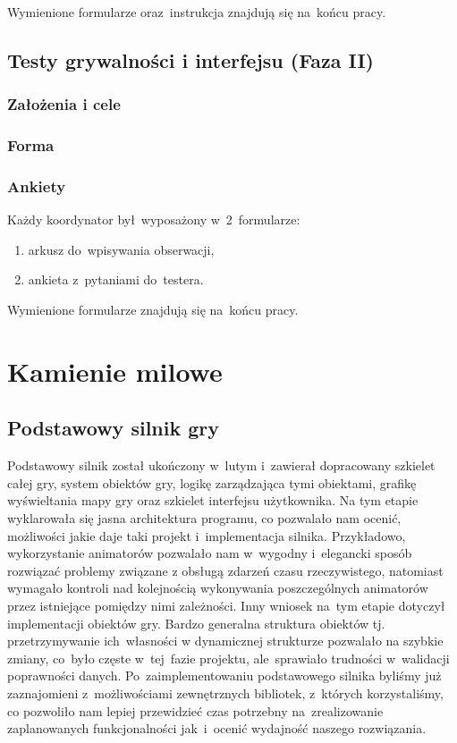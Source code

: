 \documentclass[licencjacka]{pracamgr}
\begin{document}
      \noindent
      Wymienione formularze oraz~instrukcja znajdują się na~końcu pracy.

    \section{Testy grywalności i interfejsu (Faza II)}

      \subsection{Założenia i cele}

      \subsection{Forma}

      \subsection{Ankiety}
      Każdy koordynator był~wyposażony w~2~formularze:
      \begin{enumerate}
	\item arkusz do~wpisywania obserwacji,
	\item ankieta z~pytaniami do~testera.
      \end{enumerate}

      \noindent
      Wymienione formularze znajdują się na~końcu pracy.

\chapter{Kamienie milowe}
  \section{Podstawowy silnik gry}
  Podstawowy silnik został ukończony w~lutym i~zawierał dopracowany szkielet całej gry, system obiektów gry,
  logikę zarządzająca tymi obiektami, grafikę wyświeltania mapy gry oraz szkielet interfejsu użytkownika.
  Na tym etapie wyklarowała się jasna architektura programu, co pozwalało nam ocenić, możliwości jakie
  daje taki projekt i~implementacja silnika. Przykładowo, wykorzystanie animatorów pozwalało nam w~wygodny
  i~elegancki sposób rozwiązać problemy związane z obsługą zdarzeń czasu rzeczywistego, natomiast wymagało kontroli
  nad kolejnością wykonywania poszczególnych animatorów przez istniejące pomiędzy nimi zależności. Inny wniosek
  na~tym etapie dotyczył implementacji obiektów gry. Bardzo generalna struktura obiektów tj. przetrzymywanie
  ich~własności w dynamicznej strukturze pozwalało na szybkie zmiany, co~było częste w~tej~fazie projektu,
  ale~sprawiało trudności w~walidacji poprawności danych.
  Po~zaimplementowaniu podstawowego silnika byliśmy już zaznajomieni z~możliwościami zewnętrznych bibliotek,
  z~których korzystaliśmy, co pozwoliło nam lepiej przewidzieć czas potrzebny na~zrealizowanie zaplanowanych
  funkcjonalności jak~i~ocenić wydajność naszego rozwiązania.
\end{document}
